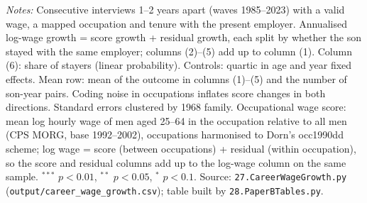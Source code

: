 \begin{table}[!htbp]
\begin{minipage}{\textwidth}\footnotesize \textit{Notes:} Consecutive interviews 1--2 years apart (waves 1985--2023) with a valid wage, a mapped occupation and tenure with the present employer. Annualised log-wage growth = score growth + residual growth, each split by whether the son stayed with the same employer; columns (2)--(5) add up to column (1). Column (6): share of stayers (linear probability). Controls: quartic in age and year fixed effects. Mean row: mean of the outcome in columns (1)--(5) and the number of son-year pairs. Coding noise in occupations inflates score changes in both directions. Standard errors clustered by 1968 family. Occupational wage score: mean log hourly wage of men aged 25--64 in the occupation relative to all men (CPS MORG, base 1992--2002), occupations harmonised to Dorn's occ1990dd scheme; log wage = score (between occupations) + residual (within occupation), so the score and residual columns add up to the log-wage column on the same sample. $^{***}$ $p<0.01$, $^{**}$ $p<0.05$, $^{*}$ $p<0.1$. Source: \texttt{27.CareerWageGrowth.py} (\texttt{output/career\_wage\_growth.csv}); table built by \texttt{28.PaperBTables.py}.\end{minipage}
\end{table}
